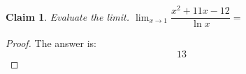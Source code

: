 \documentclass{article}
\newtheorem{theorem}{Claim}
\begin{document}
\begin{theorem}
Evaluate the limit. $ \lim_{x\to 1} \dfrac{x^2+11x-12}{\ln x}=$
\end{theorem}

\begin{proof}
The answer is:
\[
13
\]
\end{proof}
\end{document}
